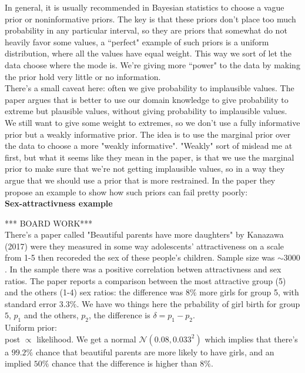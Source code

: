 \documentclass[]{article}
\begin{document}
\noindent In general, it is usually recommended in Bayesian statistics to choose a vague prior or noninformative priors. The key is that these priors don't place too much probability in any particular interval, so they are priors that somewhat do not heavily favor some values, a ``perfect" example of such priors is a uniform distribution, where all the values have equal weight. This way we sort of let the data choose where the mode is. We're giving more ``power" to the data by making the prior hold very little or no information. \\

\noindent There's a small caveat here: often we give probability to implausible values. The paper argues that is better to use our domain knowledge to give probability to extreme but plausible values, without giving probability to implausible values. We still want to give some weight to extremes, so we don't use a fully informative prior but a weakly informative prior. The idea is to use the marginal prior over the data to choose a more "weakly informative". "Weakly" sort of mislead me at first, but what it seems like they mean in the paper, is that we use the marginal prior to make sure that we're not getting implausible values, so in a way they argue that we should use a prior that is more restrained. In the paper they propose an example to show how such priors can fail pretty poorly: \\

\textbf{Sex-attractivness example}

*** BOARD WORK*** \\
There's a paper called "Beautiful parents have more daughters" by Kanazawa (2017) were they measured in some way adolescents' attractiveness on a scale from 1-5 then recoreded the sex of these people's children. Sample size was $\sim 3000$. In the sample there was a positive correlation betwen attractivness and sex ratios. The paper reports a comparison between the most attractive group (5) and the others (1-4) sex ratios: the difference was $8\%$ more girls for group 5, with standard error $3.3\%$. We have wo things here the prbability of girl birth for group $5$, $p_1$ and the others, $p_2$, the difference is $\delta = p_1 - p_2$.\\

\noindent Uniform prior:\\ 
post $\propto$ likelihood. We get a normal $\mathcal{N}(0.08, 0.033^2)$ which implies that there's a $99.2\%$ chance that beautiful parents are more likely to have girls, and an implied $50\%$ chance that the difference is higher than $8\%$. 
\end{document}
